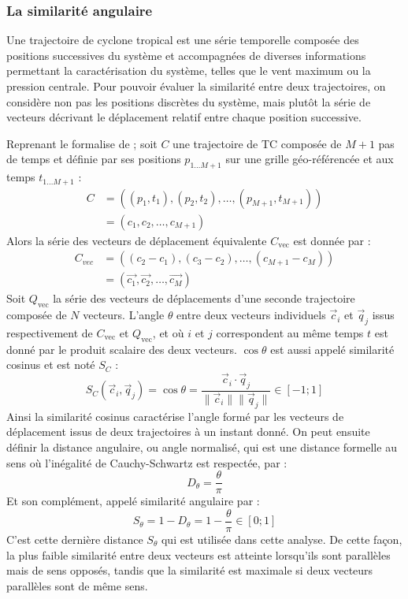\documentclass[../main.tex]{subfiles}
\begin{document}
\subsubsection*{La similarité angulaire}

Une trajectoire de cyclone tropical est une série temporelle composée des positions successives du système et accompagnées de diverses informations permettant
la caractérisation du système, telles que le vent maximum ou la pression centrale. Pour pouvoir évaluer la similarité entre deux trajectoires, on considère non
pas les positions discrètes du système, mais plutôt la série de vecteurs décrivant le déplacement relatif entre chaque position successive.

Reprenant le formalise de \cite{nakamura_shapebased_2013} ; soit $C$ une trajectoire de TC composée de $M+1$ pas de temps et définie par ses positions
$p_{1...M+1}$ sur une grille géo-référencée et aux temps $t_{1...M+1}$ :
%
\begin{align*}
    C &= ((p_1, t_1), (p_2, t_2), \ldots, (p_{M+1}, t_{M+1}))\\
      &= (c_1, c_2, \ldots, c_{M+1})
\end{align*}
%
Alors la série des vecteurs de déplacement équivalente $C_{\text{vec}}$ est donnée par :
\begin{align*}
    C_{vec} &= ((c_2 - c_1), (c_3 - c_2), \ldots, (c_{M+1} - c_M))\\
            &= (\vec{c_1}, \vec{c_2}, \ldots, \vec{c_M})
\end{align*}
%
Soit $Q_{\text{vec}}$ la série des vecteurs de déplacements d'une seconde trajectoire composée de $N$ vecteurs. L'angle $\theta$ entre deux vecteurs individuels
$\vec{c}_i$ et $\vec{q}_j$ issus respectivement de $C_{\text{vec}}$ et $Q_{\text{vec}}$, et où $i$ et $j$ correspondent au même temps $t$ est donné par le
produit scalaire des deux vecteurs. $\cos \theta$ est aussi appelé similarité cosinus et est noté $S_C$ :
%
\begin{equation*}
    S_C(\vec{c}_i, \vec{q}_j) = \cos \theta = \frac{\vec{c}_i \cdot \vec{q}_j}{\lVert \vec{c}_i \rVert \lVert \vec{q}_j \rVert} \in [-1; 1] 
\end{equation*}
%
Ainsi la similarité cosinus caractérise l'angle formé par les vecteurs de déplacement issus de deux trajectoires à un instant donné. On peut ensuite définir la
distance angulaire, ou angle normalisé, qui est une distance formelle au sens où l'inégalité de Cauchy-Schwartz est respectée, par :
%
\begin{equation*}
    D_\theta = \frac{\theta}{\pi}
\end{equation*}
%
Et son complément, appelé similarité angulaire par :
%
\begin{equation*}
    S_\theta = 1 - D_\theta = 1 - \frac{\theta}{\pi} \in [0; 1]
\end{equation*}
%
C'est cette dernière distance $S_\theta$ qui est utilisée dans cette analyse. De cette façon, la plus faible similarité entre deux vecteurs est atteinte
lorsqu'ils sont parallèles mais de sens opposés, tandis que la similarité est maximale si deux vecteurs parallèles sont de même sens.
\end{document}
